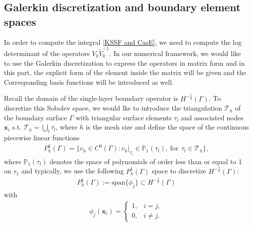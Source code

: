 \subsection{Galerkin discretization and boundary element spaces}
In order to compute the integral \eqref{KSSF and CasE}, we need to compute the log determinant of the operators $V_{k}\tilde{V}_{k}^{-1}$. In our numerical 
framework, we would like to use the Galerkin discretization to express the operators in matrix form and in this part, the explicit form of the element inside
the matrix will be given and the Corresponding basis functions will be introduced as well.

Recall the domain of the single-layer boundary operator is $H^{-\frac{1}{2}}(\Gamma)$. To discretize this Sobolev space, we would lke to introduce the 
triangulation $\mathcal{T}_{h}$ of the boundary surface $\Gamma$ with triangular surface elements $\tau_{l}$ and associated nodes $\boldsymbol{x}_{i}$ 
s.t. $\overline{\mathcal{T}_{h}} = \bigcup_{l}\overline{\tau_{l}}$, where $h$ is the mesh size and define the space of the continuous piecewise linear functions
\begin{align*}
    P_{h}^{1}(\Gamma) = \{v_{h}\in C^{0}(\Gamma): v_{h}|_{\tau_{l}}\in\mathbb{P}_{1}(\tau_{l}), \ \text{for} \ \ \tau_{l}\in\mathcal{T}_{h}\},
\end{align*}
where $\mathbb{P}_{1}(\tau_{l})$ denotes the space of polynomials of order less than or equal to 1 on $\tau_{1}$
and typically, we use the following $P_{h}^{1}(\Gamma)$ space to discretize $H^{-\frac{1}{2}}(\Gamma)$:
\begin{align*}
    P_{h}^{1}(\Gamma) := \text{span}\{\phi_{j}\} \subset H^{-\frac{1}{2}}(\Gamma)
\end{align*}
with 
\begin{align*}
    \phi_{j}(\boldsymbol{x}_{i}) = \begin{cases}
        1, & i = j,\\
        0, & i\neq j.
    \end{cases}
\end{align*}

